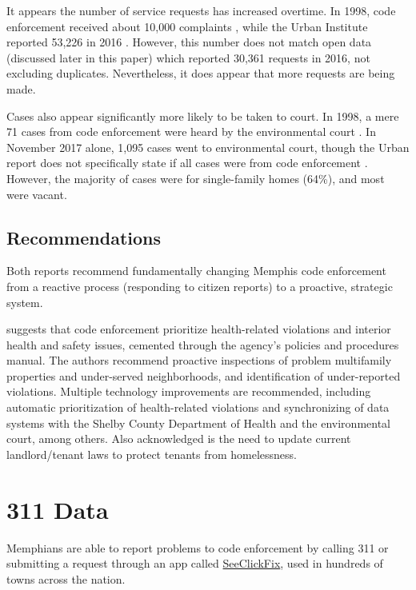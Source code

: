\documentclass[
]{book}
\begin{document}
It appears the number of service requests has increased overtime. In 1998, code enforcement received about 10,000 complaints \citep[ 93]{betts2001}, while the Urban Institute reported 53,226 in 2016 \citep[ 51]{stacy2018}. However, this number does not match open data (discussed later in this paper) which reported 30,361 requests in 2016, not excluding duplicates. Nevertheless, it does appear that more requests are being made.

Cases also appear significantly more likely to be taken to court. In 1998, a mere 71 cases from code enforcement were heard by the environmental court \citep[ 49]{betts2001}. In November 2017 alone, 1,095 cases went to environmental court, though the Urban report does not specifically state if all cases were from code enforcement \citep[ 51]{stacy2018}. However, the majority of cases were for single-family homes (64\%), and most were vacant.

\hypertarget{recommendations}{%
\subsection{Recommendations}\label{recommendations}}

Both reports recommend fundamentally changing Memphis code enforcement from a reactive process (responding to citizen reports) to a proactive, strategic system.

\citet{stacy2018} suggests that code enforcement prioritize health-related violations and interior health and safety issues, cemented through the agency's policies and procedures manual. The authors recommend proactive inspections of problem multifamily properties and under-served neighborhoods, and identification of under-reported violations. Multiple technology improvements are recommended, including automatic prioritization of health-related violations and synchronizing of data systems with the Shelby County Department of Health and the environmental court, among others. Also acknowledged is the need to update current landlord/tenant laws to protect tenants from homelessness.

\hypertarget{data}{%
\section{311 Data}\label{data}}

Memphians are able to report problems to code enforcement by calling 311 or submitting a request through an app called \href{https://seeclickfix.com/}{SeeClickFix}, used in hundreds of towns across the nation.
\end{document}
